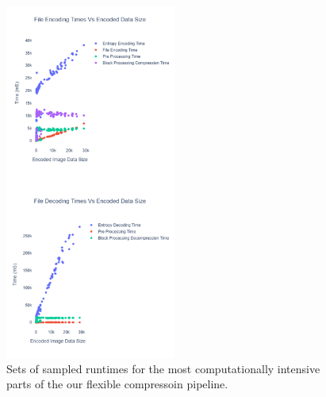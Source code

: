 \begin{figure}
    \includegraphics[width=0.5\textwidth]{assets/Runtimes Summary.png}
    \caption{Sets of sampled runtimes for the most computationally intensive parts of the our flexible compressoin pipeline.}
    \label{fig:runtimes}
\end{figure}

